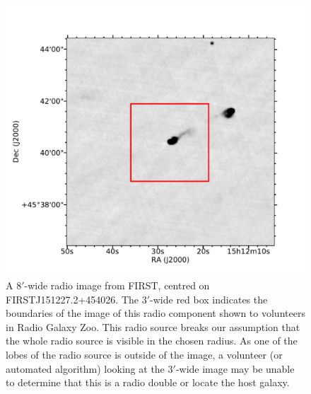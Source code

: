 \documentclass[fleqn,usenatbib,usedcolumn]{mnras}
\begin{document}
      \begin{figure}
      \centering
      \includegraphics[width=\linewidth]{images/FIRSTJ151227_fig.pdf}
      \caption{A $8'$-wide radio image from FIRST, centred on
        FIRSTJ151227.2+454026. The $3'$-wide red box indicates the boundaries of
        the image of this radio component shown to volunteers in Radio Galaxy
        Zoo. This radio source breaks our assumption that the whole radio source
        is visible in the chosen radius. As one of the lobes of the radio source
        is outside of the image, a volunteer (or automated algorithm) looking at
        the $3'$-wide image may be unable to determine that this is a radio
        double or locate the host galaxy.}
      \label{fig:broken-contains}
    \end{figure}
\end{document}
